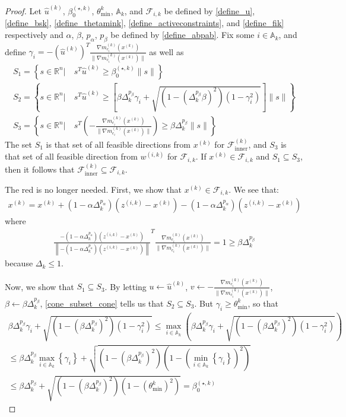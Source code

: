 \documentclass{article}
\theoremstyle{case}
\numberwithin{theorem}{subsection}
\newcommand{\activeconstraintsk}{{\mathbb A_{k}}}
\newcommand{\bsk}{{\beta_0^{(\star, k)}}}
\newcommand{\dk}{\Delta_k}
\newcommand{\fcki}{{\mathcal {F}^{(k)}_{\textrm{inner}}}}
\newcommand{\fik}{{\mathcal F_{i, k}}}
\newcommand{\gmcik}{{\nabla m_{c_i}^{(k)}\left(\xk\right)}}
\newcommand{\hgik}{{\frac{\nabla m^{(k)}_{c_i}(\xk)}{\|\nabla m^{(k)}_{c_i}(\xk)\|}}}
\newcommand{\huk}{{{\hat u}^{(k)}}}
\newcommand{\Rn}{\mathbb R^n}
\newcommand{\thetamink}{{\theta^k_{\textrm{min}}}}
\newcommand{\wik}{{w^{(i, k)}}}
\newcommand{\xk}{{x^{(k)}}}
\newcommand{\zik}{{z^{(i, k)}}}
\begin{document}
\begin{proof}
Let 
$\huk$, $\bsk$, $\thetamink$, $\activeconstraintsk$, and $\fik$
be defined by
\cref{define_u}, \cref{define_bsk}, \cref{define_thetamink}, \cref{define_activeconstraints}, and \cref{define_fik} 
respectively and $\alpha$, $\beta$, $p_{\alpha}$, $p_{\beta}$ be defined by \cref{define_abpab}.
Fix some $i \in \activeconstraintsk$, and define $\gamma_i = -\left(\huk\right)^T\hgik$ as well as
\begin{align*}
S_1 = \left\{s\in\Rn | \quad s^T\huk\ge\bsk\|s\| \right\} \\
S_2 = \left\{s\in\Rn | \quad s^T\huk\ge\left[\beta\dk^{p_{\beta}}\gamma_i + \sqrt{(1 - \left(\dk^{p_{\beta}}\beta\right)^2)\left(1 - \gamma_i^2\right)}\right]\|s\| \right\} \\
S_3 = \left\{s\in\Rn | \quad s^T\left(-\hgik\right)\ge\beta\dk^{p_{\beta}}\|s\| \right\}
\end{align*}
The set $S_1$ is that set of all feasible directions from $\xk$ for $\fcki$, and $S_3$ is that set of all feasible direction from $\wik$ for $\fik$.
If $\xk \in \fik$ and $S_1 \subseteq S_3$, then it follows that $\fcki \subseteq \fik$.

\color{red}
The red is no longer needed.
First, we show that $\xk \in \fik$.
We see that:
\begin{align*}
\xk = \xk + \left(1 - \alpha\dk^{p_{\alpha} }\right)(\zik - \xk) - \left(1 - \alpha\dk^{p_{\alpha} }\right)(\zik - \xk)
\end{align*}
where
\begin{align*}
\frac{-\left(1 - \alpha\dk^{p_{\alpha} }\right)(\zik - \xk)}{\left\|-\left(1 - \alpha\dk^{p_{\alpha} }\right)(\zik - \xk)\right\|}^T\hgik = 1 \ge \beta \dk^{p_{\beta}}
\end{align*}
because $\dk \le 1$.
\color{black}

Now, we show that $S_1 \subseteq S_3$.
By letting $u \gets \huk$, $v \gets -\hgik$, $\beta \gets \beta \dk^{p_{\beta}}$, \cref{cone_subset_cone} tells us that
$S_2 \subseteq S_3$.
But $\gamma_i \ge \thetamink$, so that
\begin{align*}
\beta\dk^{p_{\beta}}\gamma_i + \sqrt{\left(1 - \left(\beta\dk^{p_{\beta}}\right)^2\right)\left(1 - \gamma_i^2\right)}
\le \max_{i\in\activeconstraintsk} \left(\beta\dk^{p_{\beta}}\gamma_i + \sqrt{\left(1 - \left(\beta\dk^{p_{\beta}}\right)^2\right)\left(1 - \gamma_i^2\right)}\right) \\
\le \beta\dk^{p_{\beta}} \max_{i\in\activeconstraintsk}\left\{\gamma_i\right\} + \sqrt{\left(1 - \left(\beta\dk^{p_{\beta}}\right)^2\right)\left(1 - \left(\min_{i\in\activeconstraintsk}\left\{\gamma_i\right\}\right)^2\right)} \\
\le \beta\dk^{p_{\beta}} + \sqrt{\left(1 - \left(\beta\dk^{p_{\beta}}\right)^2\right)\left(1 - \left(\thetamink\right)^2\right)} = \bsk
\end{align*}


\end{proof}
\end{document}
